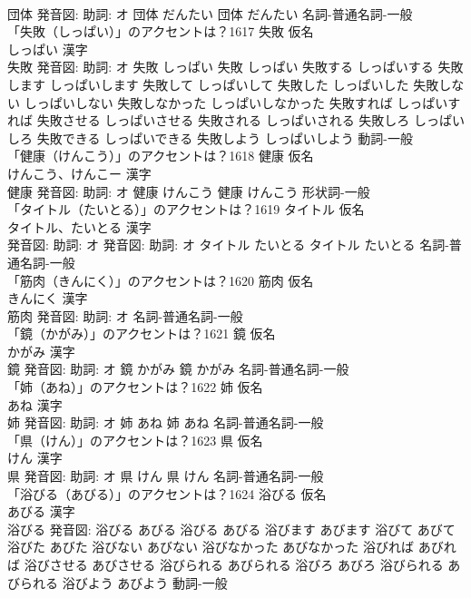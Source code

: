 \documentclass[8pt]{extreport}
\begin{document}
\begin{CJK}{UTF8}{min}
\\	団体 発音図: 助詞: オ	団体 だんたい		団体 だんたい				名詞-普通名詞-一般 
\\	「失敗（しっぱい）」のアクセントは？1617	失敗 仮名　
\\	しっぱい 漢字　
\\	失敗 発音図: 助詞: オ	失敗 しっぱい		失敗 しっぱい 失敗する しっぱいする 失敗します しっぱいします 失敗して しっぱいして 失敗した しっぱいした 失敗しない しっぱいしない 失敗しなかった しっぱいしなかった 失敗すれば しっぱいすれば 失敗させる しっぱいさせる 失敗される しっぱいされる 失敗しろ しっぱいしろ 失敗できる しっぱいできる 失敗しよう しっぱいしよう				動詞-一般 
\\	「健康（けんこう）」のアクセントは？1618	健康 仮名　
\\	けんこう、けんこー 漢字　
\\	健康 発音図: 助詞: オ	健康 けんこう		健康 けんこう				形状詞-一般 
\\	「タイトル（たいとる）」のアクセントは？1619	タイトル 仮名　
\\	タイトル、たいとる 漢字　
\\	発音図: 助詞: オ 発音図: 助詞: オ	タイトル たいとる		タイトル たいとる				名詞-普通名詞-一般 
\\	「筋肉（きんにく）」のアクセントは？1620	筋肉 仮名　
\\	きんにく 漢字　
\\	筋肉 発音図: 助詞: オ							名詞-普通名詞-一般 
\\	「鏡（かがみ）」のアクセントは？1621	鏡 仮名　
\\	かがみ 漢字　
\\	鏡 発音図: 助詞: オ	鏡 かがみ		鏡 かがみ				名詞-普通名詞-一般 
\\	「姉（あね）」のアクセントは？1622	姉 仮名　
\\	あね 漢字　
\\	姉 発音図: 助詞: オ	姉 あね		姉 あね				名詞-普通名詞-一般 
\\	「県（けん）」のアクセントは？1623	県 仮名　
\\	けん 漢字　
\\	県 発音図: 助詞: オ	県 けん		県 けん				名詞-普通名詞-一般 
\\	「浴びる（あびる）」のアクセントは？1624	浴びる 仮名　
\\	あびる 漢字　
\\	浴びる 発音図:	浴びる あびる		浴びる あびる 浴びます あびます 浴びて あびて 浴びた あびた 浴びない あびない 浴びなかった あびなかった 浴びれば あびれば 浴びさせる あびさせる 浴びられる あびられる 浴びろ あびろ 浴びられる あびられる 浴びよう あびよう				動詞-一般 

\end{CJK}
\end{document}
